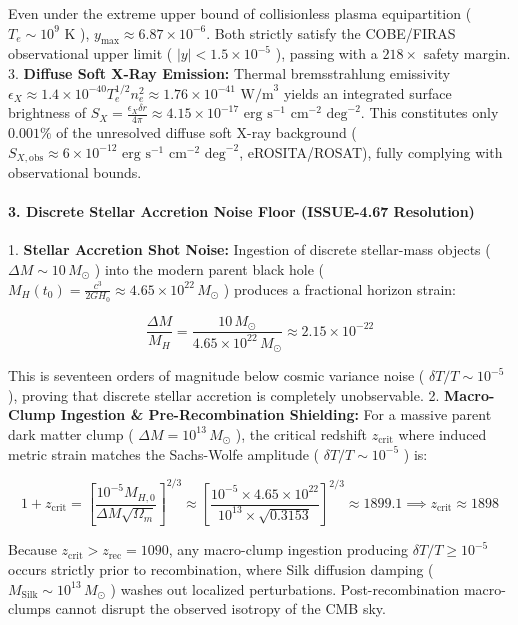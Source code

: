 \documentclass[11pt,a4paper]{article}
\theoremstyle{definition}\newtheorem{definition}{Definition}
\theoremstyle{remark}\newtheorem{remark}{Remark}
\begin{document}
Even under the extreme upper bound of collisionless plasma equipartition ( $T_e \sim 10^9\text{ K}$ ), $y_{\text{max}} \approx 6.87 \times 10^{-6}$. Both strictly satisfy the COBE/FIRAS observational upper limit ( $|y| < 1.5 \times 10^{-5}$ ), passing with a $218\times$ safety margin.
3. \textbf{Diffuse Soft X-Ray Emission:} Thermal bremsstrahlung emissivity $\epsilon_X \approx 1.4 \times 10^{-40} T_e^{1/2} n_e^2 \approx 1.76 \times 10^{-41}\text{ W/m}^3$ yields an integrated surface brightness of $S_X = \frac{\epsilon_X \delta r}{4\pi} \approx 4.15 \times 10^{-17}\text{ erg s}^{-1}\text{ cm}^{-2}\text{ deg}^{-2}$. This constitutes only $0.001\%$ of the unresolved diffuse soft X-ray background ( $S_{X, \text{obs}} \approx 6 \times 10^{-12}\text{ erg s}^{-1}\text{ cm}^{-2}\text{ deg}^{-2}$, eROSITA/ROSAT), fully complying with observational bounds.
\paragraph{3. Discrete Stellar Accretion Noise Floor (ISSUE-4.67 Resolution)}

1. \textbf{Stellar Accretion Shot Noise:} Ingestion of discrete stellar-mass objects ( $\Delta M \sim 10 \, M_\odot$ ) into the modern parent black hole ( $M_H(t_0) = \frac{c^3}{2 G H_0} \approx 4.65 \times 10^{22} \, M_\odot$ ) produces a fractional horizon strain:


\begin{equation}
\frac{\Delta M}{M_H} = \frac{10 \, M_\odot}{4.65 \times 10^{22} \, M_\odot} \approx 2.15 \times 10^{-22}
\end{equation}


This is seventeen orders of magnitude below cosmic variance noise ( $\delta T/T \sim 10^{-5}$ ), proving that discrete stellar accretion is completely unobservable.
2. \textbf{Macro-Clump Ingestion \& Pre-Recombination Shielding:} For a massive parent dark matter clump ( $\Delta M = 10^{13} \, M_\odot$ ), the critical redshift $z_{\text{crit}}$ where induced metric strain matches the Sachs-Wolfe amplitude ( $\delta T/T \sim 10^{-5}$ ) is:


\begin{equation}
1 + z_{\text{crit}} = \left[\frac{10^{-5} M_{H, 0}}{\Delta M \sqrt{\Omega_m}}\right]^{2/3} \approx \left[\frac{10^{-5} \times 4.65 \times 10^{22}}{10^{13} \times \sqrt{0.3153}}\right]^{2/3} \approx 1899.1 \implies z_{\text{crit}} \approx 1898
\end{equation}


Because $z_{\text{crit}} > z_{\text{rec}} = 1090$, any macro-clump ingestion producing $\delta T/T \ge 10^{-5}$ occurs strictly prior to recombination, where Silk diffusion damping ( $M_{\text{Silk}} \sim 10^{13} \, M_\odot$ ) washes out localized perturbations. Post-recombination macro-clumps cannot disrupt the observed isotropy of the CMB sky.
\end{document}
